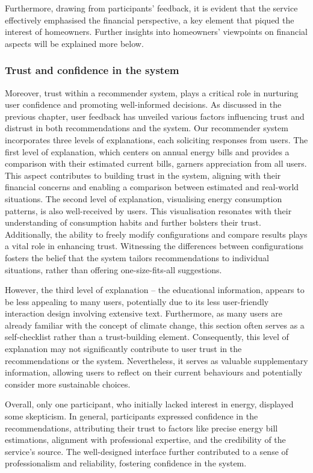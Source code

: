 Furthermore, drawing from participants' feedback, it is evident that the service effectively emphasised the financial perspective, a key element that piqued the interest of homeowners. 
Further insights into homeowners' viewpoints on financial aspects will be explained more below.


\subsubsection*{Trust and confidence in the system}

Moreover, trust within a recommender system, plays a critical role in nurturing user confidence and promoting well-informed decisions.
As discussed in the previous chapter, user feedback has unveiled various factors influencing trust and distrust in both recommendations and the system. 
Our recommender system incorporates three levels of explanations, each soliciting responses from users.
The first level of explanation, which centers on annual energy bills and provides a comparison with their estimated current bills, garners appreciation from all users. 
This aspect contributes to building trust in the system, aligning with their financial concerns and enabling a comparison between estimated and real-world situations. 
The second level of explanation, visualising energy consumption patterns, is also well-received by users. 
This visualisation resonates with their understanding of consumption habits and further bolsters their trust. 
Additionally, the ability to freely modify configurations and compare results plays a vital role in enhancing trust. 
Witnessing the differences between configurations fosters the belief that the system tailors recommendations to individual situations, rather than offering one-size-fits-all suggestions. 

However, the third level of explanation -- the educational information, appears to be less appealing to many users, potentially due to its less user-friendly interaction design involving extensive text. 
Furthermore, as many users are already familiar with the concept of climate change, this section often serves as a self-checklist rather than a trust-building element. 
Consequently, this level of explanation may not significantly contribute to user trust in the recommendations or the system. 
Nevertheless, it serves as valuable supplementary information, allowing users to reflect on their current behaviours and potentially consider more sustainable choices.

Overall, only one participant, who initially lacked interest in energy, displayed some skepticism. 
In general, participants expressed confidence in the recommendations, 
attributing their trust to factors like precise energy bill estimations, alignment with professional expertise, and the credibility of the service's source. 
The well-designed interface further contributed to a sense of professionalism and reliability, fostering confidence in the system.


